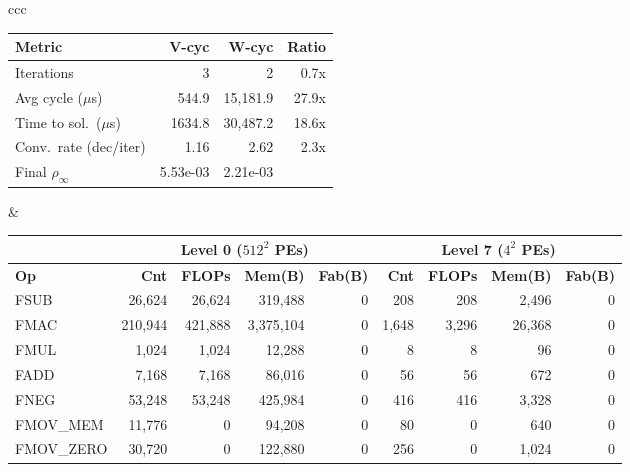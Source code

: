 \documentclass[conference]{IEEEtran}
\begin{document}
\begin{table}[t]
\begin{tabular}{ccc}
\begin{minipage}[t]{0.30\textwidth}
        \vspace{6pt}
\setlength{\tabcolsep}{2pt}
\begin{tabular}{|l||r|r|r|} \hline
    \textbf{Metric} & \textbf{V-cyc} & \textbf{W-cyc} & \textbf{Ratio} \\
 \hline \hline \hline
    Iterations& 3& 2&0.7x \\ \hline
    Avg cycle ($\mu$s)      &    544.9&  15,181.9& 27.9x\\ \hline
    Time to sol.\ ($\mu$s)  &  1634.8& 30,487.2& 18.6x\\ \hline
    Conv.\ rate (dec/iter)  &     1.16&      2.62&  2.3x\\ \hline
    Final $\rho_{\infty}$ & 5.53e-03 & 2.21e-03 & \\
\hline
\end{tabular}
    \end{minipage}
&    
~~~~\begin{minipage}[t]{0.68\textwidth}
\vspace{0pt}
        \centering
        \setlength{\tabcolsep}{1.5pt}
\begin{tabular}{|l||r|r|r|r||r|r|r|r|} \hline
            & \multicolumn{4}{c||}{\textbf{Level 0 ($512^2$ PEs)}} & \multicolumn{4}{c|}{\textbf{Level 7 ($4^2$ PEs)}} \\ \hline
            \textbf{Op} & \textbf{Cnt} & \textbf{FLOPs} & \textbf{Mem(B)} & \textbf{Fab(B)} & \textbf{Cnt} & \textbf{FLOPs} & \textbf{Mem(B)} & \textbf{Fab(B)} \\ \hline \hline
            FSUB       &   26,624 &    26,624 &    319,488 &       0 &      208 &      208 &      2,496 &       0 \\ \hline
            FMAC       &  210,944 &   421,888 &  3,375,104 &       0 &    1,648 &    3,296 &     26,368 &       0 \\ \hline
            FMUL       &    1,024 &     1,024 &     12,288 &       0 &        8 &        8 &         96 &       0 \\ \hline
            FADD       &    7,168 &     7,168 &     86,016 &       0 &       56 &       56 &        672 &       0 \\ \hline
            FNEG       &   53,248 &    53,248 &    425,984 &       0 &      416 &      416 &      3,328 &       0 \\ \hline
            FMOV\_MEM  &   11,776 &         0 &     94,208 &       0 &       80 &        0 &        640 &       0 \\ \hline
            FMOV\_ZERO &   30,720 &         0 &    122,880 &       0 &      256 &        0 &      1,024 &       0 \\ \hline

\end{tabular}
\end{minipage}
\end{tabular}
\end{table}
\end{document}
